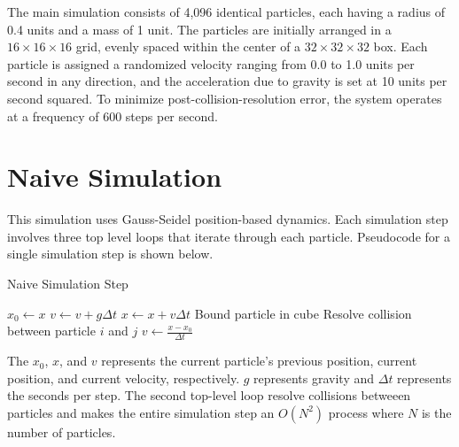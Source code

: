 \indent\indent 
The main simulation consists of 4,096 identical particles, each having a radius of 0.4 units and a mass of 1 unit. The particles are initially arranged in a $16 \times 16 \times 16$ grid, evenly spaced within the center of a $32 \times 32 \times 32$ box. Each particle is assigned a randomized velocity ranging from 0.0 to 1.0 units per second in any direction, and the acceleration due to gravity is set at 10 units per second squared. To minimize post-collision-resolution error, the system operates at a frequency of 600 steps per second.

\vspace{-0.4em} %

\section{Naive Simulation}
\indent \indent This simulation uses Gauss-Seidel position-based dynamics. 
Each simulation step involves three top level loops that iterate through each particle. Pseudocode for a single simulation step is shown below.

\begin{algorithm}
  \caption{Naive Simulation Step}\label{alg:cap}
  \begin{algorithmic}
      \State $x_0 \gets x$
      \State $v \gets v + g \Delta t$
      \State $x \gets x + v \Delta t$
      \State Bound particle in cube
    \EndFor
        \State Resolve collision between particle $i$ and $j$
      \EndFor
    \EndFor
      \State $v \gets \frac{x - x_0}{\Delta t}$
    \EndFor
  \end{algorithmic}
\end{algorithm}

\indent\indent The $x_0$, $x$, and $v$ represents the 
current particle's previous position, current position, and current velocity, respectively. 
$g$ represents gravity and $\Delta t$ represents the seconds per step. 
The second top-level loop resolve collisions betweeen particles
and makes the entire simulation step an $O(N^2)$ process where $N$ is the number of particles.

